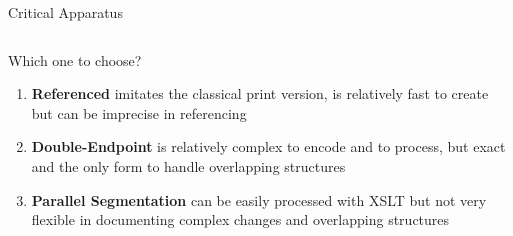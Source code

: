 \begin{frame}{Critical Apparatus}
\begin{columns}
\begin{block}{Which one to choose?}
\begin{enumerate}\footnotesize
    \item \textbf{Referenced} imitates the classical print version, is relatively fast to create but can be imprecise in referencing
    \item \textbf{Double-Endpoint} is relatively complex to encode and to process, but exact and the only form to handle overlapping structures
    \item \textbf{Parallel Segmentation} can be easily processed with XSLT but not very flexible in documenting complex changes and overlapping structures
\end{enumerate}
\end{block}
\end{columns}


\end{frame}


